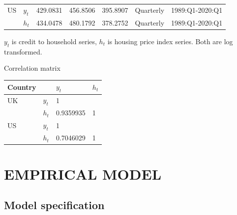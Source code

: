 \documentclass[12pt]{article}
\begin{document}
\begin{outline}[enumerate]
\begin{center}
\begin{threeparttable}
\begin{tabular}{@{}llSSSll@{}}
					US & $y_t$ & 429.0831 & 456.8506 & 395.8907 & Quarterly & 1989:Q1-2020:Q1\\[2pt] 
					
					& $h_t$ & 434.0478 & 480.1792 & 378.2752 & Quarterly & 1989:Q1-2020:Q1\\[2pt] 
					
					\bottomrule
				\end{tabular}
				\begin{tablenotes}
					\small
					\item $y_t$ is credit to household series, $h_t$ is housing price index series. Both are log transformed. \\
				\end{tablenotes}
			\end{threeparttable}

		
		


			\begin{threeparttable}
				\caption {\label{tab:table2} Correlation matrix}
				\begin{tabular}{@{}llll@{}}
					\toprule
					Country & & $y_t$ & $h_t$ \\
					\midrule
					UK & $y_t$ & 1 &  \\[2pt] 
					
					& $h_t$ & 0.9359935 & 1 \\[2pt] 
					\midrule
					US & $y_t$ & 1 &  \\[2pt] 
					
					& $h_t$ & 0.7046029 & 1 \\[2pt] 
					
					\bottomrule
				\end{tabular}
			\end{threeparttable}
			\end{center}
		
		\clearpage
		\section {EMPIRICAL MODEL}
		\subsection{Model specification}
		

\end{outline}
\end{document}
